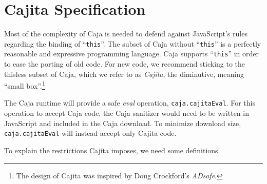 \documentclass[letterpaper,twocolumn,10pt]{article}
\newcommand{\code}[1]{{\tt {#1}}}              %
\begin{document}
\section{Cajita Specification}
\label{sec:cajita-spec}

Most of the complexity of Caja is needed to defend against JavaScript's rules 
regarding the binding of ``\code{this}''. The subset of Caja without 
``\code{this}'' is a perfectly reasonable and expressive programming 
language. Caja supports ``\code{this}'' in order to ease the porting of old 
code. For new code, we recommend sticking to the thisless subset of Caja, 
which we refer to as \emph{Cajita}, the diminutive, meaning ``small 
box''.\footnote{
%
The design of Cajita was inspired by Doug Crockford's \emph{ADsafe}.
%
}

The Caja runtime will provide a safe \emph{eval} operation, \code{caja.cajitaEval}. For 
this operation to accept Caja code, the Caja sanitizer would need to be 
written in JavaScript and included in the Caja download. To minimize download 
size, \code{caja.cajitaEval} will instead accept only Cajita code.

To explain the restrictions Cajita imposes, we need some definitions.
\end{document}
